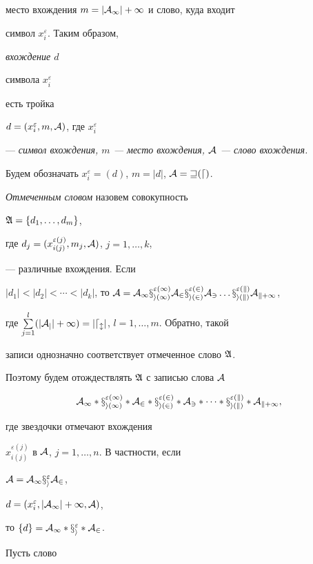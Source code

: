 место вхождения $m=|\cal A_1|+1$ и слово, куда входит


символ $x^{\varepsilon}_i$. Таким образом, {\it вхождение $d$


символа $x^{\varepsilon}_i$} есть тройка


$d=(x^{\varepsilon}_i,m,\cal A)$, где $x^{\varepsilon}_i$


--- {\it символ вхождения, $m$ --- место вхождения, $\cal A$ --- слово вхождения.}


Будем обозначать $x^{\varepsilon}_i=(d)$, $m=|d|$, $\cal A=w(d)$.





{\it Отмеченным словом} назовем совокупность


$\frak A=\{d_1,\dotsc,d_m\}$,


где $d_j=(x^{\varepsilon (j)}_{i(j)},m_j,\cal A)$, $j=1,\dotsc,k$,


--- различные вхождения. Если


$|d_1|<|d_2|<\dotsb<|d_k|$, то $\cal A=\cal A_1


x^{\varepsilon (1)}_{i(1)}\cal A_2


x^{\varepsilon (2)}_{i(2)}\cal A_3\dotsc


x^{\varepsilon (k)}_{i(k)}\cal A_{k+1}$,


где $\sum\limits^l_{j=1}(|\cal A_j|+1)=|d_l|$, $l=1,\dotsc,m$. Обратно, такой 


записи однозначно соответствует отмеченное слово $\frak A$.


Поэтому будем отождествлять $\frak A$ с записью слова $\cal A$


$$


\cal A_1 *x^{\varepsilon (1)}_{i(1)} *


\cal A_2 *x^{\varepsilon (2)}_{i(2)} *\cal A_3 *\dotsb


*x^{\varepsilon (k)}_{i(k)} *\cal A_{k+1},


$$


где звездочки отмечают вхождения


$x^{\varepsilon(j)}_{i(j)}$ в $\cal A$, $j=1,\dotsc,n$. В частности, если


$\cal A=\cal A_1 x^{\varepsilon}_i \cal A_2$,


$d=(x^{\varepsilon}_i,|\cal A_1|+1,\cal A)$,


то $\{d\}=\cal A_1 *x^{\varepsilon}_i *\cal A_2$.





Пусть слово


